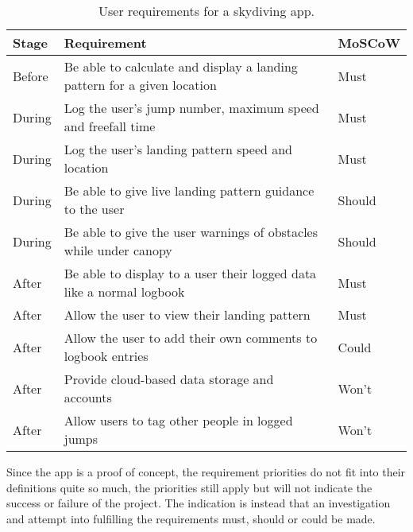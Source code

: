 \begin{table*}[ht]
  \centering
  \caption{User requirements for a skydiving app.}\label{tab:user-requirements}
  \begin{tabular}{@{}lll@{}}
    \toprule
    Stage  & Requirement & MoSCoW \\
    \midrule
    Before & Be able to calculate and display a landing pattern for a given location & Must \\
    During & Log the user's jump number, maximum speed and freefall time & Must \\
    During & Log the user's landing pattern speed and location & Must \\
    During & Be able to give live landing pattern guidance to the user & Should \\
    During & Be able to give the user warnings of obstacles while under canopy & Should \\
    After  & Be able to display to a user their logged data like a normal logbook & Must \\
    After  & Allow the user to view their landing pattern & Must \\
    After  & Allow the user to add their own comments to logbook entries & Could \\
    After  & Provide cloud-based data storage and accounts & Won't \\
    After  & Allow users to tag other people in logged jumps & Won't \\
    \bottomrule
  \end{tabular}
\end{table*}

Since the app is a proof of concept, the requirement priorities do not fit into their definitions quite so much, the priorities still apply but will not indicate the success or failure of the project. The indication is instead that an investigation and attempt into fulfilling the requirements must, should or could be made.
